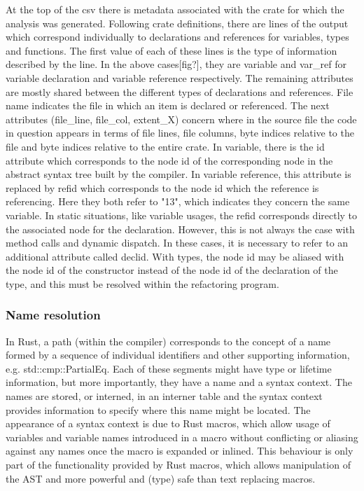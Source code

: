 At the top of the csv there is metadata associated with the crate for which the analysis was generated. Following crate definitions, there are lines of the output which correspond individually to declarations and references for variables, types and functions. The first value of each of these lines is the type of information described by the line. In the above cases[fig?], they are variable and var\_ref for variable declaration and variable reference respectively. The remaining attributes are mostly shared between the different types of declarations and references. File name indicates the file in which an item is declared or referenced. The next attributes (file\_line, file\_col, extent\_X) concern where in the source file the code in question appears in terms of file lines, file columns, byte indices relative to the file and byte indices relative to the entire crate. In variable, there is the id attribute which corresponds to the node id of the corresponding node in the abstract syntax tree built by the compiler. In variable reference, this attribute is replaced by refid which corresponds to the node id which the reference is referencing. Here they both refer to "13", which indicates they concern the same variable. In static situations, like variable usages, the refid corresponds directly to the associated node for the declaration. However, this is not always the case with method calls and dynamic dispatch. In these cases, it is necessary to refer to an additional attribute called declid. With types, the node id may be aliased with the node id of the constructor instead of the node id of the declaration of the type, and this must be resolved within the refactoring program.

\subsubsection{Name resolution}
In Rust, a path (within the compiler) corresponds to the concept of a name formed by a sequence of individual identifiers and other supporting information, e.g. std::cmp::PartialEq. Each of these segments might have type or lifetime information, but more importantly, they have a name and a syntax context. The names are stored, or interned, in an interner table and the syntax context provides information to specify where this name might be located. The appearance of a syntax context is due to Rust macros, which allow usage of variables and variable names introduced in a macro without conflicting or aliasing against any names once the macro is expanded or inlined. This behaviour is only part of the functionality provided by Rust macros, which allows manipulation of the AST and more powerful and (type) safe than text replacing macros.

